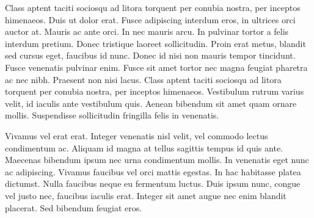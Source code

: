 \documentclass[rascunho,xindy]{fei}
\begin{document}
\begin{agradecimentos}
Class aptent taciti sociosqu ad litora torquent per conubia nostra, per inceptos himenaeos. Duis ut dolor erat. Fusce adipiscing interdum eros, in ultrices orci auctor at. Mauris ac ante orci. In nec mauris arcu. In pulvinar tortor a felis interdum pretium. Donec tristique laoreet sollicitudin. Proin erat metus, blandit sed cursus eget, faucibus id nunc. Donec id nisi non mauris tempor tincidunt. Fusce venenatis pulvinar enim. Fusce sit amet tortor nec magna feugiat pharetra ac nec nibh. Praesent non nisi lacus. Class aptent taciti sociosqu ad litora torquent per conubia nostra, per inceptos himenaeos. Vestibulum rutrum varius velit, id iaculis ante vestibulum quis. Aenean bibendum sit amet quam ornare mollis. Suspendisse sollicitudin fringilla felis in venenatis.

Vivamus vel erat erat. Integer venenatis nisl velit, vel commodo lectus condimentum ac. Aliquam id magna at tellus sagittis tempus id quis ante. Maecenas bibendum ipsum nec urna condimentum mollis. In venenatis eget nunc ac adipiscing. Vivamus faucibus vel orci mattis egestas. In hac habitasse platea dictumst. Nulla faucibus neque eu fermentum luctus. Duis ipsum nunc, congue vel justo nec, faucibus iaculis erat. Integer sit amet augue nec enim blandit placerat. Sed bibendum feugiat eros.
\end{agradecimentos}
\end{document}
